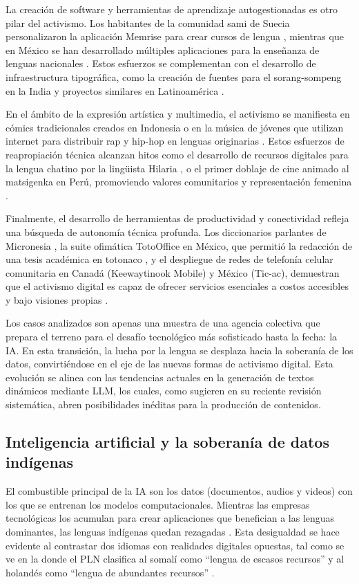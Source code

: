 \documentclass[spanish]{textolivre}
\begin{document}
La creación de software y herramientas de aprendizaje autogestionadas es otro pilar del activismo. Los habitantes de la comunidad sami de Suecia personalizaron la aplicación Memrise para crear cursos de lengua \cite{LlanesOrtiz2023}, mientras que en México se han desarrollado múltiples aplicaciones para la enseñanza de lenguas nacionales \cite{MaldonadoRivera2018}. Estos esfuerzos se complementan con el desarrollo de infraestructura tipográfica, como la creación de fuentes para el sorang-sompeng en la India \cite{LlanesOrtiz2023} y proyectos similares en Latinoamérica \cite{SecretariaCultura2016}.

En el ámbito de la expresión artística y multimedia, el activismo se manifiesta en cómics tradicionales creados en Indonesia \cite{LlanesOrtiz2023}o en la música de jóvenes que utilizan internet para distribuir rap y hip-hop en lenguas originarias \cite{Francese2023}. Estos esfuerzos de reapropiación técnica alcanzan hitos como el desarrollo de recursos digitales para la lengua chatino por la lingüista Hilaria \textcite{Cruz2021}, o el primer doblaje de cine animado al matsigenka en Perú, promoviendo valores comunitarios y representación femenina \cite{SolariPita2021,LlanesOrtiz2023}.

Finalmente, el desarrollo de herramientas de productividad y conectividad refleja una búsqueda de autonomía técnica profunda. Los diccionarios parlantes de Micronesia \cite{LlanesOrtiz2023}, la suite ofimática TotoOffice en México, que permitió la redacción de una tesis académica en totonaco \cite{DeanceBravoTroncoso2017}, y el despliegue de redes de telefonía celular comunitaria en Canadá (Keewaytinook Mobile) y México (Tic-ac), demuestran que el activismo digital es capaz de ofrecer servicios esenciales a costos accesibles y bajo visiones propias \cite{Dyson2016,LlanesOrtiz2023}.

Los casos analizados son apenas una muestra de una agencia colectiva que prepara el terreno para el desafío tecnológico más sofisticado hasta la fecha: la IA. En esta transición, la lucha por la lengua se desplaza hacia la soberanía de los datos, convirtiéndose en el eje de las nuevas formas de activismo digital. Esta evolución se alinea con las tendencias actuales en la generación de textos dinámicos mediante LLM, los cuales, como sugieren \textcite{Ribeiro2025} en su reciente revisión sistemática, abren posibilidades inéditas para la producción de contenidos.

\subsection{Inteligencia artificial y la soberanía de datos indígenas}
El combustible principal de la IA son los datos (documentos, audios y videos) con los que se entrenan los modelos computacionales. Mientras las empresas tecnológicas los acumulan para crear aplicaciones que benefician a las lenguas dominantes, las lenguas indígenas quedan rezagadas \cite{Joshi2020,Tonja2024}. Esta desigualdad se hace evidente al contrastar dos idiomas con realidades digitales opuestas, tal como se ve en la  donde el PLN clasifica al somalí como “lengua de escasos recursos” y al holandés como “lengua de abundantes recursos” \cite{Mussandi2024}.
\end{document}
